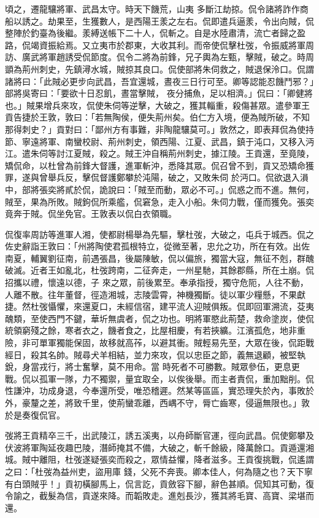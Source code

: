 \begin{pinyinscope}
 頃之，遷龍驤將軍、武昌太守。時天下饑荒，山夷
 多斷江劫掠。侃令諸將詐作商船以誘之。劫果至，生獲數人，是西陽王羕之左右。侃即遣兵逼羕，令出向賊，侃整陣於釣臺為後繼。羕縛送帳下二十人，侃斬之。自是水陸肅清，流亡者歸之盈路，侃竭資振給焉。又立夷市於郡東，大收其利。而帝使侃擊杜弢，令振威將軍周訪、廣武將軍趙誘受侃節度。侃令二將為前鋒，兄子輿為左甄，擊賊，破之。時周顗為荊州刺史，先鎮潯水城，賊掠其良口。侃使部將朱伺救之，賊退保泠口。侃謂諸將曰：「此賊必更步向武昌，吾宜還城，晝夜三日行可至。卿等認能忍饑鬥邪？」部將吳寄曰：「要欲十日忍飢，晝當擊賊，
 夜分捕魚，足以相濟。」侃曰：「卿健將也。」賊果增兵來攻，侃使朱伺等逆擊，大破之，獲其輜重，殺傷甚眾。遣參軍王貢告捷於王敦，敦曰：「若無陶侯，便失荊州矣。伯仁方入境，便為賊所破，不知那得刺史？」貢對曰：「鄙州方有事難，非陶龍驤莫可。」敦然之，即表拜侃為使持節、寧遠將軍、南蠻校尉、荊州刺史，領西陽、江夏、武昌，鎮于沌口，又移入沔江。遣朱伺等討江夏賊，殺之。賊王沖自稱荊州刺史，據江陵。王貢還，至竟陵，矯侃命，以杜曾為前鋒大督護，進軍斬沖，悉降其眾。侃召曾不到，貢又恐矯命獲罪，遂與曾舉兵反，擊侃督護鄭攀於沌陽，破之，又敗朱伺
 於沔口。侃欲退入溳中，部將張奕將貳於侃，詭說曰：「賊至而動，眾必不可。」侃惑之而不進。無何，賊至，果為所敗。賊鉤侃所乘艦，侃窘急，走入小船。朱伺力戰，僅而獲免。張奕竟奔于賊。侃坐免官。王敦表以侃白衣領職。



 侃復率周訪等進軍人湘，使都尉楊舉為先驅，擊杜弢，大破之，屯兵于城西。侃之佐史辭詣王敦曰：「州將陶使君孤根特立，從微至著，忠允之功，所在有效。出佐南夏，輔翼劉征南，前遇張昌，後屬陳敏，侃以偏旅，獨當大寇，無征不剋，群醜破滅。近者王如亂北，杜弢跨南，二征奔走，一州星馳，其餘郡縣，所在土崩。侃招攜以禮，懷遠以德，子
 來之眾，前後累至。奉承指授，獨守危阨，人往不動，人離不散。往年董督，徑造湘城，志陵雲霄，神機獨斷。徒以軍少糧懸，不果獻捷。然杜弢懾懼，來還夏口，未經信宿，建平流人迎賊俱叛。侃即回軍溯流，芟夷醜類，至使西門不鍵，華圻無虞者，侃之功也。明將軍愍此荊楚，救命塗炭，使侃統領窮殘之餘，寒者衣之，饑者食之，比屋相慶，有若挾纊。江濱孤危，地非重險，非可單軍獨能保固，故移就高莋，以避其衝。賊輕易先至，大眾在後，侃距戰經日，殺其名帥。賊尋犬羊相結，並力來攻，侃以忠臣之節，義無退顧，被堅執銳，身當戎行，將士奮擊，莫不用命。當
 時死者不可勝數。賊眾參伍，更息更戰。侃以孤軍一隊，力不獨禦，量宜取全，以俟後舉。而主者責侃，重加黜削。侃性謙沖，功成身退，今奉還所受，唯恐稽遲。然某等區區，實恐理失於內，事敗於外，豪釐之差，將致千里，使荊蠻乖離，西嵎不守，脣亡齒寒，侵逼無限也。」敦於是奏復侃官。



 弢將王貢精卒三千，出武陵江，誘五溪夷，以舟師斷官運，徑向武昌。侃使鄭攀及伏波將軍陶延夜趣巴陵，潛師掩其不備，大破之，斬千餘級，降萬餘口。貢遁還湘城。賊中離阻，杜弢遂疑張奕而殺之，眾情益懼，降者滋多。王貢復挑戰，侃遙謂之曰：「杜弢為益州吏，盜用庫
 錢，父死不奔喪。卿本佳人，何為隨之也？天下寧有白頭賊乎！」貢初橫腳馬上，侃言訖，貢斂容下腳，辭色甚順。侃知其可動，復令諭之，截髮為信，貢遂來降。而韜敗走。進剋長沙，獲其將毛寶、高寶、梁堪而還。




\end{pinyinscope}
